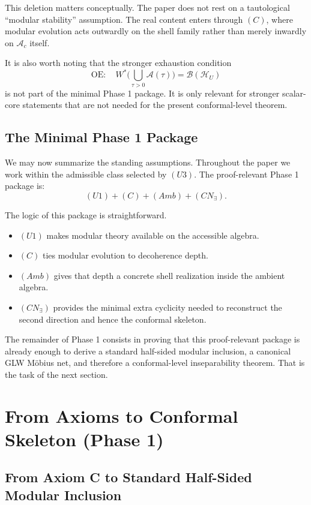 \documentclass[12pt]{article}
\theoremstyle{definition}
\theoremstyle{remark}
\newcommand{\tightlist}{%
  \setlength{\itemsep}{0pt}\setlength{\parskip}{0pt}}
\begin{document}
This deletion matters conceptually. The paper does not rest on a
tautological ``modular stability'' assumption. The real content enters
through \((C)\), where modular evolution acts outwardly on the shell
family rather than merely inwardly on \(\mathcal{A}_c\) itself.

It is also worth noting that the stronger exhaustion condition \[
\mathrm{OE}: \quad W^*\!\Big(\bigcup_{\tau>0}\mathcal{A}(\tau)\Big)=\mathcal{B}(\mathcal{H}_U)
\] is not part of the minimal Phase 1 package. It is only relevant for
stronger scalar-core statements that are not needed for the present
conformal-level theorem.

\subsection{The Minimal Phase 1
Package}\label{the-minimal-phase-1-package}

We may now summarize the standing assumptions. Throughout the paper we
work within the admissible class selected by \((U3)\). The
proof-relevant Phase 1 package is: \[
(U1)+(C)+(Amb)+(CN_\exists).
\]

The logic of this package is straightforward.

\begin{itemize}
\tightlist
\item
  \((U1)\) makes modular theory available on the accessible algebra.
\item
  \((C)\) ties modular evolution to decoherence depth.
\item
  \((Amb)\) gives that depth a concrete shell realization inside the
  ambient algebra.
\item
  \((CN_\exists)\) provides the minimal extra cyclicity needed to
  reconstruct the second direction and hence the conformal skeleton.
\end{itemize}

The remainder of Phase 1 consists in proving that this proof-relevant
package is
already enough to derive a standard half-sided modular inclusion, a
canonical GLW Möbius net, and therefore a conformal-level inseparability
theorem. That is the task of the next section.

\section{From Axioms to Conformal Skeleton (Phase
1)}\label{from-axioms-to-conformal-skeleton-phase-1}

\subsection{From Axiom C to Standard Half-Sided Modular
Inclusion}\label{from-axiom-c-to-standard-half-sided-modular-inclusion}
\end{document}
